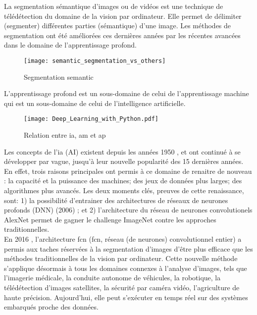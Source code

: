 ﻿\noindent La segmentation sémantique d'images ou de vidéos est une technique de télédétection du domaine de la vision par ordinateur. Elle permet de délimiter (segmenter) différentes parties (sémantique) d'une image. Les méthodes de segmentation ont été améliorées ces dernières années par les récentes avancées dans le domaine de l'apprentissage profond. 
\begin{figure}[H]
   \centering
   \texttt{[image: semantic\_segmentation\_vs\_others]}
   \caption[Segmentation semantic]{Segmentation semantic\parencite[p.~1]{wu_recent_2019}}
   \label{fig:semantic_segmentation_vs_others}
\end{figure}
\noindent L’apprentissage profond est un sous-domaine de celui de l'apprentissage machine qui est un sous-domaine de celui de l'intelligence artificielle. 
\begin{figure}[H]
   \centering
   \texttt{[image: Deep\_Learning\_with\_Python.pdf]}
   \caption[Relation entre \acrlong{ia}, \acrlong{am} et \acrlong{ap}]{Relation entre \acrlong{ia}, \acrlong{am} et \acrlong{ap} \parencite[p.~4]{chollet_deep_2018}}
   \label{fig:ia_ml_ap}
\end{figure}
\noindent Les concepts de l'\lowercase{\acrlong{ia}} (AI) existent depuis les années 1950 \parencite[p.~4]{chollet_deep_2018} \parencite[p.~1]{alom_history_2018}, et ont continué à se développer par vague, jusqu'à leur nouvelle popularité des 15 dernières années. En effet, trois raisons principales ont permis à ce domaine de renaitre de nouveau \parencite[p.~20]{chollet_deep_2018}: la capacité et la puissance des machines; des jeux de données plus larges; des algorithmes plus avancés. Les deux moments clés, preuves de cette renaissance, sont: 1) la possibilité d'entrainer des architectures de réseaux de neurones profonds (DNN) (2006) \parencite[p.~6]{alom_history_2018}; et 2) l'architecture du réseau de neurones convolutionels AlexNet permet de  gagner le challenge ImageNet contre les approches traditionnelles\parencite[p.~11]{alom_history_2018}. 
\vspace{\baselineskip}
\\
\noindent En 2016 \parencite[p.~14]{alom_history_2018}, l'architecture \acrshort{fcn} (\acrlong{fcn}, réseau (de neurones) convolutionnel entier) a permis aux taches réservées à la segmentation d'images d'être plus efficace que les méthodes traditionnelles de la vision par ordinateur. Cette nouvelle méthode s'applique désormais à tous les domaines connexes à l'analyse d'images, tels que l'imagerie médicale, la conduite autonome de véhicules, la robotique, la télédétection d'images satellites, la sécurité par caméra vidéo, l'agriculture de haute précision. Aujourd'hui, elle peut s'exécuter en temps réel sur des systèmes embarqués proche des données. 